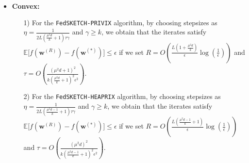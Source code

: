 \begin{theorem}
\begin{itemize}
     \item \textbf{Convex:}
     \begin{itemize}
         \item[1)]For the \texttt{FedSKETCH-PRIVIX} algorithm, by choosing stepsizes as $\eta=\frac{1}{2L\left(\frac{\mu^2d}{k}+1\right)\tau\gamma}$ and $\gamma\geq k$, we obtain that the iterates satisfy $ \mathbb{E}\Big[f({\boldsymbol{w}}^{(R)})-f({\boldsymbol{w}}^{(*)})\Big]\leq \epsilon$ if we set
     $R=O\left(\frac{L\left(1+\frac{\mu^2d}{k}\right)}{\epsilon}\log\left(\frac{1}{\epsilon}\right)\right)$ and $ \tau=O\left(\frac{\left(\mu^2d+1\right)^2}{k\left(\frac{\mu^2d}{k}+1\right)^2\epsilon^2}\right).$
         \item[2)] For the \texttt{FedSKETCH-HEAPRIX} algorithm,
by choosing stepsizes as $\eta=\frac{1}{2L\left(\frac{\mu^2d-1}{k}+1\right)\tau\gamma}$ and $\gamma\geq k$, we obtain that the iterates satisfy $ \mathbb{E}\Big[f({\boldsymbol{w}}^{(R)})-f({\boldsymbol{w}}^{(*)})\Big]\leq \epsilon$ if we set
     $R=O\left(\frac{L\left(\frac{\mu^2d-1}{k}+1\right)}{\epsilon}\log\left(\frac{1}{\epsilon}\right)\right)$ and $ \tau=O\left(\frac{\left(\mu^2d\right)^2}{k\left(\frac{\mu^2d-1}{k}+1\right)^2\epsilon^2}\right).$ 
     \end{itemize}
 \end{itemize}
\end{theorem}







